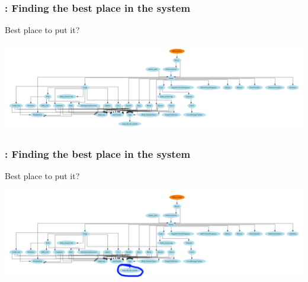 
\begin{frame}
    \frametitle{: Finding the best place in the system}
    Best place to put it?
    \centerline{\includegraphics[scale=0.15]{images/module-data-flow.png}}
\end{frame}

\begin{frame}
    \frametitle{: Finding the best place in the system}
    Best place to put it?
    \centerline{\includegraphics[scale=0.15]{images/module-data-flow-tags-misp-feeder.png}}
\end{frame}

